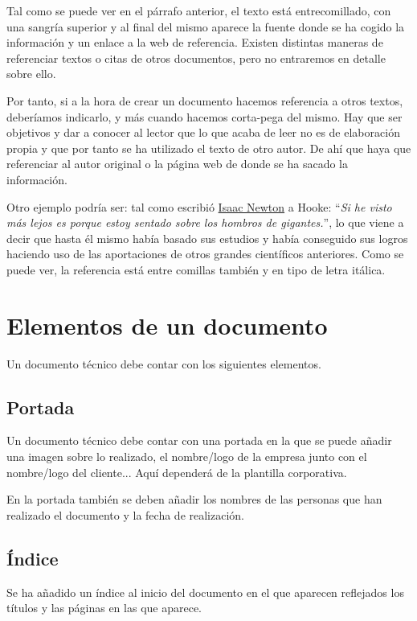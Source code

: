 Tal como se puede ver en el párrafo anterior, el texto está entrecomillado, con una sangría superior y al final del mismo aparece la fuente donde se ha cogido la información y un enlace a la web de referencia. Existen distintas maneras de referenciar textos o citas de otros documentos, pero no entraremos en detalle sobre ello.


Por tanto, si a la hora de crear un documento hacemos referencia a otros textos, deberíamos indicarlo, y más cuando hacemos corta-pega del mismo. Hay que ser objetivos y dar a conocer al lector que lo que acaba de leer no es de elaboración propia y que por tanto se ha utilizado el texto de otro autor. De ahí que haya que referenciar al autor original o la página web de donde se ha sacado la información.

Otro ejemplo podría ser: tal como escribió \href{https://es.wikipedia.org/wiki/Isaac_Newton}{Isaac Newton} a Hooke: “\textit{Si he visto más lejos es porque estoy sentado sobre los hombros de gigantes.}”, lo que viene a decir que hasta él mismo había basado sus estudios y había conseguido sus logros haciendo uso de las aportaciones de otros grandes científicos anteriores. Como se puede ver, la referencia está entre comillas también y en tipo de letra itálica.


\chapter{Elementos de un documento}

Un documento técnico debe contar con los siguientes elementos.

\section{Portada}
Un documento técnico debe contar con una portada en la que se puede añadir una imagen sobre lo realizado, el nombre/logo de la empresa junto con el nombre/logo del cliente... Aquí dependerá de la plantilla corporativa.

En la portada también se deben añadir los nombres de las personas que han realizado el documento y la fecha de realización.


\section{Índice}

Se ha añadido un índice al inicio del documento en el que aparecen reflejados los títulos y las páginas en las que aparece.

